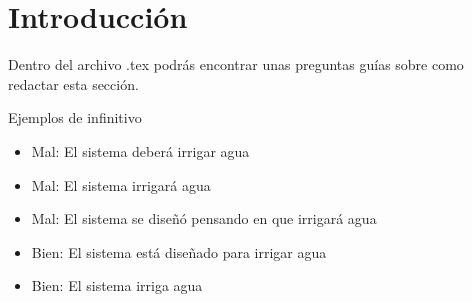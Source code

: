 




\section{Introducción}
Dentro del archivo .tex podrás encontrar unas preguntas guías sobre como redactar esta sección.

Ejemplos de infinitivo
\begin{itemize}
    \item Mal: El sistema deberá irrigar agua
    \item Mal: El sistema irrigará agua
    \item Mal: El sistema se diseñó pensando en que irrigará agua
    \item Bien: El sistema está diseñado para irrigar agua 
    \item Bien: El sistema irriga agua
\end{itemize}